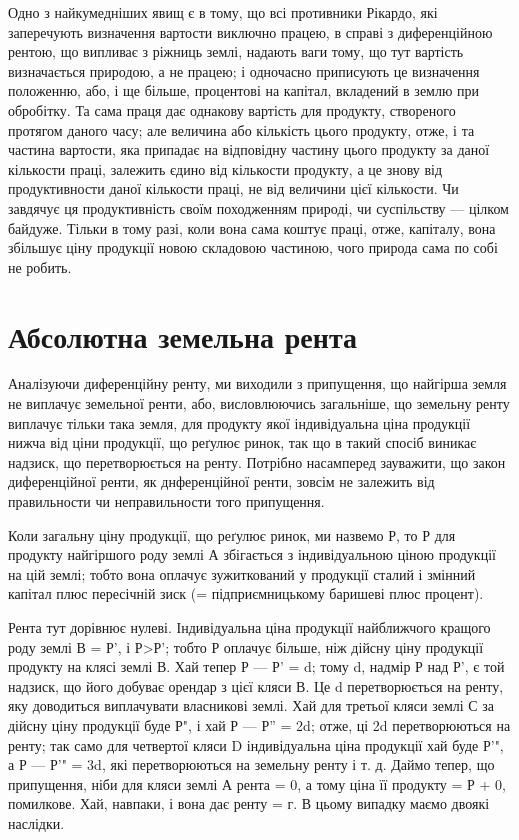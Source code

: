 
Одно з найкумедніших явищ є в тому, що всі противники Рікардо, які
заперечують визначення вартости виключно працею, в справі з диференційною
рентою, що випливає з ріжниць землі, надають ваги тому, що тут вартість
визначається природою, а не працею; і одночасно приписують це визначення
положенню, або, і ще більше, процентові на капітал, вкладений в землю при
обробітку. Та сама праця дає однакову вартість для продукту, створеного
протягом даного часу; але величина або кількість цього продукту, отже, і та
частина вартости, яка припадає на відповідну частину цього продукту за даної
кількости праці, залежить єдино від кількости продукту, а це знову від продуктивности
даної кількости праці, не від величини цієї кількости. Чи завдячує
ця продуктивність своїм походженням природі, чи суспільству — цілком байдуже.
Тільки в тому разі, коли вона сама коштує праці, отже, капіталу, вона
збільшує ціну продукції новою складовою частиною, чого природа сама по собі
не робить.

\section{Абсолютна земельна рента}

Аналізуючи диференційну ренту, ми виходили з припущення, що найгірша
земля не виплачує земельної ренти, або, висловлюючись загальніше, що земельну
ренту виплачує тільки така земля, для продукту якої індивідуальна ціна продукції
нижча від ціни продукції, що реґулює ринок, так що в такий спосіб
виникає надзиск, що перетворюється на ренту. Потрібно насамперед зауважити,
що закон диференційної ренти, як днференційної ренти, зовсім не залежить від
правильности чи неправильности того припущення.

Коли загальну ціну продукції, що реґулює ринок, ми назвемо Р, то Р для
продукту найгіршого роду землі А збігається з індивідуальною ціною продукції
на цій землі; тобто вона оплачує зужиткований у продукції сталий і змінний капітал
плюс пересічній зиск (= підприємницькому баришеві плюс процент).

Рента тут дорівнює нулеві. Індивідуальна ціна продукції найближчого
кращого роду землі В = Р', і Р>Р'; тобто Р оплачує більше, ніж дійсну
ціну продукції продукту на клясі землі В. Хай тепер Р — Р' = d; тому
d, надмір Р над Р', є той надзиск, що його добуває орендар з цієї кляси В.
Це d перетворюється на ренту, яку доводиться виплачувати власникові землі.
Хай для третьої кляси землі С за дійсну ціну продукції буде Р", і хай Р —
Р'' = 2d; отже, ці 2d перетворюються на ренту; так само для четвертої кляси
D індивідуальна ціна продукції хай буде Р'", а Р — Р'" = 3d, які перетворюються
на земельну ренту і т. д. Даймо тепер, що припущення, ніби для
кляси землі А рента = 0, а тому ціна її продукту = Р + 0, помилкове. Хай,
навпаки, і вона дає ренту = г. В цьому випадку маємо двоякі наслідки.

